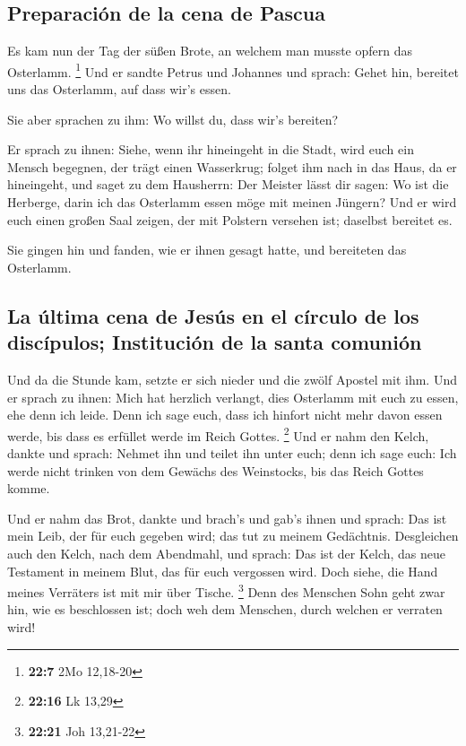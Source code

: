 \hypertarget{preparaciuxf3n-de-la-cena-de-pascua}{%
\subsection{Preparación de la cena de
Pascua}\label{preparaciuxf3n-de-la-cena-de-pascua}}

 Es kam nun der Tag der süßen Brote, an welchem man musste
opfern das Osterlamm. \footnote{\textbf{22:7} 2Mo 12,18-20}
 Und er sandte Petrus und Johannes und sprach: Gehet hin,
bereitet uns das Osterlamm, auf dass wir's essen.

 Sie aber sprachen zu ihm: Wo willst du, dass wir's
bereiten?

 Er sprach zu ihnen: Siehe, wenn ihr hineingeht in die
Stadt, wird euch ein Mensch begegnen, der trägt einen Wasserkrug; folget
ihm nach in das Haus, da er hineingeht,  und saget zu dem
Hausherrn: Der Meister lässt dir sagen: Wo ist die Herberge, darin ich
das Osterlamm essen möge mit meinen Jüngern?  Und er wird
euch einen großen Saal zeigen, der mit Polstern versehen ist; daselbst
bereitet es.

 Sie gingen hin und fanden, wie er ihnen gesagt hatte,
und bereiteten das Osterlamm.

\hypertarget{la-uxfaltima-cena-de-jesuxfas-en-el-cuxedrculo-de-los-discuxedpulos-instituciuxf3n-de-la-santa-comuniuxf3n}{%
\subsection{La última cena de Jesús en el círculo de los discípulos;
Institución de la santa
comunión}\label{la-uxfaltima-cena-de-jesuxfas-en-el-cuxedrculo-de-los-discuxedpulos-instituciuxf3n-de-la-santa-comuniuxf3n}}

 Und da die Stunde kam, setzte er sich nieder und die
zwölf Apostel mit ihm.  Und er sprach zu ihnen: Mich hat
herzlich verlangt, dies Osterlamm mit euch zu essen, ehe denn ich leide.
 Denn ich sage euch, dass ich hinfort nicht mehr davon
essen werde, bis dass es erfüllet werde im Reich Gottes. \footnote{\textbf{22:16}
  Lk 13,29}  Und er nahm den Kelch, dankte und sprach:
Nehmet ihn und teilet ihn unter euch;  denn ich sage
euch: Ich werde nicht trinken von dem Gewächs des Weinstocks, bis das
Reich Gottes komme.

 Und er nahm das Brot, dankte und brach's und gab's ihnen
und sprach: Das ist mein Leib, der für euch gegeben wird; das tut zu
meinem Gedächtnis.  Desgleichen auch den Kelch, nach dem
Abendmahl, und sprach: Das ist der Kelch, das neue Testament in meinem
Blut, das für euch vergossen wird.  Doch siehe, die Hand
meines Verräters ist mit mir über Tische. \footnote{\textbf{22:21} Joh
  13,21-22}  Denn des Menschen Sohn geht zwar hin, wie es
beschlossen ist; doch weh dem Menschen, durch welchen er verraten wird!

